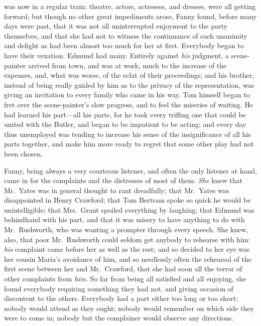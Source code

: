  was now in a regular train:  theatre, actors,
actresses, and dresses, were all getting forward;
but though no other great impediments arose, Fanny found,
before many days were past, that it was not all uninterrupted
enjoyment to the party themselves, and that she had
not to witness the continuance of such unanimity and
delight as had been almost too much for her at first.
Everybody began to have their vexation.  Edmund had many.
Entirely against \emph{his} judgment, a scene-painter arrived
from town, and was at work, much to the increase
of the expenses, and, what was worse, of the eclat of
their proceedings; and his brother, instead of being really
guided by him as to the privacy of the representation,
was giving an invitation to every family who came in his way.
Tom himself began to fret over the scene-painter's
slow progress, and to feel the miseries of waiting.
He had learned his part---all his parts, for he took
every trifling one that could be united with the Butler,
and began to be impatient to be acting; and every day
thus unemployed was tending to increase his sense of
the insignificance of all his parts together, and make
him more ready to regret that some other play had not been chosen.

Fanny, being always a very courteous listener, and often
the only listener at hand, came in for the complaints
and the distresses of most of them.  \emph{She} knew that
Mr.\ Yates was in general thought to rant dreadfully;
that Mr.\ Yates was disappointed in Henry Crawford;
that Tom Bertram spoke so quick he would be unintelligible;
that Mrs.\ Grant spoiled everything by laughing; that Edmund
was behindhand with his part, and that it was misery
to have anything to do with Mr.\ Rushworth, who was wanting
a prompter through every speech.  She knew, also, that poor
Mr.\ Rushworth could seldom get anybody to rehearse with him:
\emph{his} complaint came before her as well as the rest;
and so decided to her eye was her cousin Maria's
avoidance of him, and so needlessly often the rehearsal
of the first scene between her and Mr.\ Crawford, that she
had soon all the terror of other complaints from \emph{him}.
So far from being all satisfied and all enjoying,
she found everybody requiring something they had not,
and giving occasion of discontent to the others.
Everybody had a part either too long or too short;
nobody would attend as they ought; nobody would remember on
which side they were to come in; nobody but the complainer
would observe any directions.

